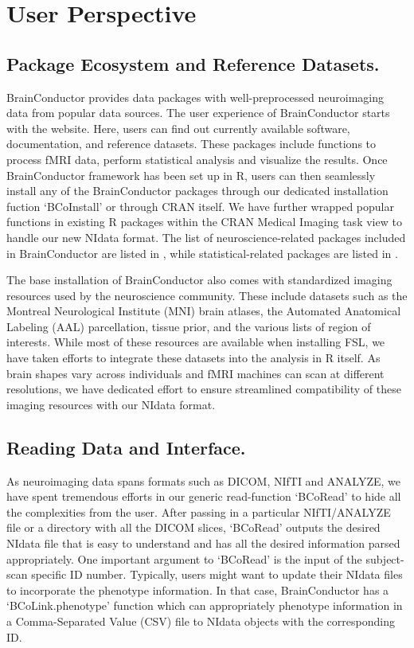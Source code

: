 \documentclass{nature}
\begin{document}
\section{User Perspective}


\subsection{Package Ecosystem and Reference Datasets.}
BrainConductor provides data packages with well-preprocessed neuroimaging data
from popular data sources.
The user experience of BrainConductor starts with the website. Here, users can
find out currently available software, documentation, and reference datasets.
These packages include functions to process fMRI data, perform statistical
analysis and visualize the results.
Once BrainConductor framework has been set up in R, users can then
seamlessly install any of the BrainConductor packages through our
dedicated installation fuction `BCoInstall' or through CRAN itself.
We have further wrapped popular functions in existing R packages
within the CRAN Medical Imaging task view to handle our new NIdata format.
The list of neuroscience-related packages included in BrainConductor are listed
in , while statistical-related packages are listed in
.


The base installation of BrainConductor also comes with standardized imaging
resources
used by the neuroscience community. These include datasets such
as the Montreal Neurological
Institute (MNI) brain atlases, the Automated Anatomical Labeling (AAL)
parcellation,
tissue prior,
and the various lists of region of interests. While most of these
resources are available when installing FSL, we have taken
efforts to integrate these datasets into the analysis in R itself.
As brain shapes vary across individuals
and fMRI machines can scan at different resolutions, we have
dedicated effort
to ensure streamlined compatibility of these imaging resources with our NIdata
format.

\subsection{Reading Data and Interface.}
As neuroimaging data spans formats such as DICOM, NIfTI and ANALYZE, we have
spent tremendous efforts in our generic read-function `BCoRead' to hide
all the complexities from the user. After passing in a particular NIfTI/ANALYZE
file
or a directory with all the DICOM slices, `BCoRead' outputs the desired NIdata
file
that is easy to understand and has all the desired information parsed
appropriately.
One important argument to `BCoRead' is the input of the subject-scan specific ID
number. 
Typically, users might want to update their NIdata files to incorporate the
phenotype information. In that case, BrainConductor has a `BCoLink.phenotype'
function
which can appropriately phenotype information in a Comma-Separated Value (CSV)
file
to NIdata objects with the corresponding ID.
\end{document}

